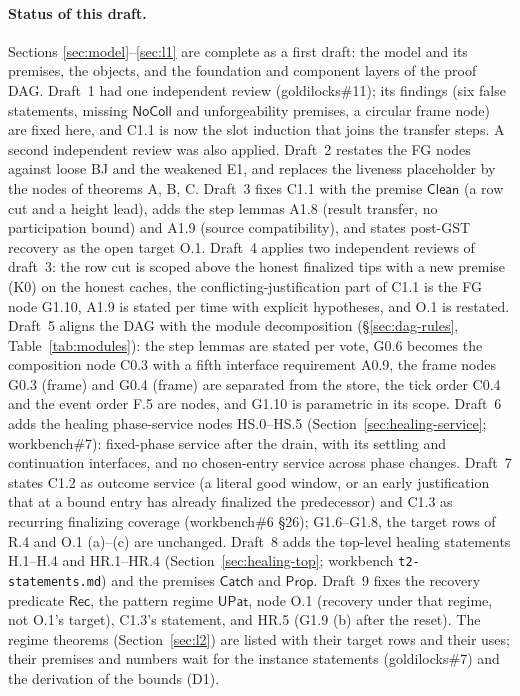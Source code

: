 \documentclass{article}
\begin{document}
\paragraph{Status of this draft.}  Sections \ref{sec:model}--\ref{sec:l1}
are complete as a first draft: the model and its premises, the objects, and
the foundation and component layers of the proof DAG.  Draft~1 had one
independent review (goldilocks\#11); its findings (six false statements,
missing $\mathsf{NoColl}$ and unforgeability premises, a circular frame node)
are fixed here, and C1.1 is now the slot induction that joins the transfer
steps.  A second independent review was also applied.  Draft~2 restates the
FG nodes against loose BJ and the weakened E1, and replaces the liveness
placeholder by the nodes of theorems A, B, C.  Draft~3 fixes C1.1 with the
premise $\mathsf{Clean}$ (a row cut and a height lead), adds the step lemmas
A1.8 (result transfer, no participation bound) and A1.9 (source
compatibility), and states post-GST recovery as the open target O.1.
Draft~4 applies two independent reviews of draft~3: the row cut is scoped above
the honest finalized tips with a new premise (K0) on the honest caches, the
conflicting-justification part of C1.1 is the FG node G1.10, A1.9 is stated
per time with explicit hypotheses, and O.1 is restated.  Draft~5 aligns the DAG with
the module decomposition (\S\ref{sec:dag-rules}, Table~\ref{tab:modules}): the
step lemmas are stated per vote, G0.6 becomes the composition node C0.3 with a
fifth interface requirement A0.9, the frame nodes G0.3 (frame) and G0.4 (frame)
are separated from the store, the tick order C0.4 and the event order F.5 are
nodes, and G1.10 is parametric in its scope.  Draft~6 adds the healing
phase-service nodes HS.0--HS.5 (Section~\ref{sec:healing-service}; workbench\#7):
fixed-phase service after the drain, with its settling and continuation
interfaces, and no chosen-entry service across phase changes.  Draft~7 states
C1.2 as outcome service (a literal good window, or an early justification that
at a bound entry has already finalized the predecessor) and C1.3 as recurring finalizing coverage (workbench\#6
\S26); G1.6--G1.8, the target rows of R.4 and O.1 (a)--(c) are unchanged.  Draft~8 adds the top-level
healing statements H.1--H.4 and HR.1--HR.4 (Section~\ref{sec:healing-top};
workbench \texttt{t2-statements.md}) and the premises $\mathsf{Catch}$ and
$\mathsf{Prop}$.  Draft~9 fixes the recovery predicate $\mathsf{Rec}$, the
pattern regime $\mathsf{UPat}$, node O.1 (recovery under that regime, not O.1's
target), C1.3's statement, and HR.5 (G1.9 (b) after the reset).  The regime theorems
(Section~\ref{sec:l2}) are listed with their target rows and their uses; their
premises and numbers wait for the instance statements (goldilocks\#7) and
the derivation of the bounds (D1).
\end{document}
